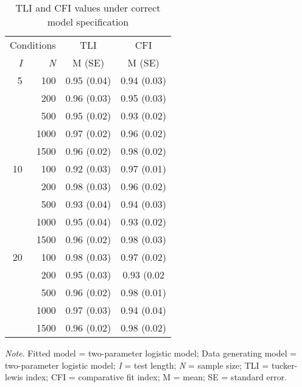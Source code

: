 \documentclass[Royal,sageapa,times,doublespace]{sagej}
\begin{document}
\begin{table}[ht]
\caption{TLI and CFI values under correct model specification}
\begin{tabular}{ r r | c c }
\toprule
\multicolumn{2}{c}{Conditions} & \multicolumn{1}{c}{TLI} & \multicolumn{1}{c}{CFI} \\
\textit{I} & \textit{N} & M (SE) & M (SE) \\
\midrule
 5 & 100 & 0.95 (0.04) & 0.94 (0.03) \\
& 200 & 0.96 (0.03) & 0.95 (0.03) \\
& 500 & 0.95 (0.02) & 0.93 (0.02) \\
& 1000 & 0.97 (0.02) & 0.96 (0.02) \\
& 1500 & 0.96 (0.02) & 0.98 (0.02) \\
10 & 100 & 0.92 (0.03) & 0.97 (0.01) \\
& 200 & 0.98 (0.03) & 0.96 (0.02)\\
& 500 & 0.93 (0.04) & 0.94 (0.03) \\
& 1000 & 0.95 (0.04) & 0.93 (0.02) \\
& 1500 & 0.96 (0.02) & 0.98 (0.03)\\
20 & 100 & 0.98 (0.03) & 0.97 (0.02) \\
& 200 & 0.95 (0.03) & 0.93 (0.02 \\
& 500 & 0.96 (0.02) & 0.98 (0.01)\\
& 1000 & 0.97 (0.03) & 0.94 (0.04) \\
& 1500 & 0.96 (0.02) & 0.98 (0.02) \\
\bottomrule
\end{tabular}

\bigskip
\small\textit{Note}. Fitted model = two-parameter logistic model; Data generating model = two-parameter logistic model; \textit{I} = test length; \textit{N} = sample size; TLI = tucker-lewis index; CFI = comparative fit index; M = mean; SE = standard error.
\label{tab:4}
\end{table}

\newpage
\end{document}
